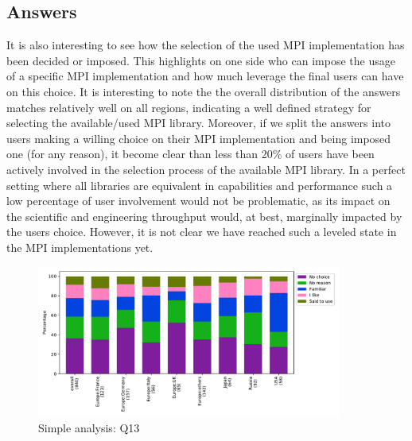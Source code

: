 
\subsection{Answers}


It is also interesting to see how the selection of the used MPI implementation has been decided or imposed. This highlights on one side who can impose the usage of a specific MPI implementation and how much leverage the final users can have on this choice. It is interesting to note the the overall distribution of the answers matches relatively well on all regions, indicating a well defined strategy for selecting the available/used MPI library. Moreover, if we split the answers into users making a willing choice on their MPI implementation and being imposed one (for any reason), it become clear than less than 20\% of users have been actively involved in the selection process of the available MPI library.
%
In a perfect setting where all libraries are equivalent in capabilities and performance such a low percentage of user involvement would not be problematic, as its impact on the scientific and engineering throughput would, at best, marginally impacted by the users choice. However, it is not clear we have reached such a leveled state in the MPI implementations yet.

\begin{figure}[htb]
\begin{center}
\includegraphics[width=10cm]{../pdfs/Q13.pdf}
\caption{Simple analysis: Q13}
\label{fig:Q13}
\end{center}
\end{figure}
